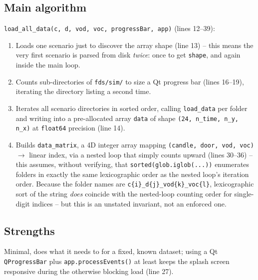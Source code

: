 \documentclass[11pt,a4paper]{report}
\begin{document}
\subsection{Main algorithm}
\texttt{load\_all\_data(c, d, vod, voc, progressBar, app)} (lines 12--39):
\begin{enumerate}[nosep]
\item Loads one scenario just to discover the array shape (line 13) -- this means the very first
scenario is parsed from disk \emph{twice}: once to get \texttt{shape}, and again inside the main loop.
\item Counts sub-directories of \texttt{fds/sim/} to size a Qt progress bar (lines 16--19), iterating
the directory listing a second time.
\item Iterates all scenario directories in sorted order, calling \texttt{load\_data} per folder and
writing into a pre-allocated array \texttt{data} of shape
\texttt{(24, n\_time, n\_y, n\_x)} at \texttt{float64} precision (line 14).
\item Builds \texttt{data\_matrix}, a 4D integer array mapping \texttt{(candle, door, vod, voc)}
$\to$ linear index, via a nested loop that simply counts upward (lines 30--36) -- this assumes,
without verifying, that \texttt{sorted(glob.iglob(...))} enumerates folders in exactly the same
lexicographic order as the nested loop's iteration order. Because the folder names are
\texttt{c\{i\}\_d\{j\}\_vod\{k\}\_voc\{l\}}, lexicographic sort of the string \emph{does} coincide with
the nested-loop counting order for single-digit indices -- but this is an unstated invariant, not an
enforced one.
\end{enumerate}

\subsection{Strengths}
Minimal, does what it needs to for a fixed, known dataset; using a Qt \texttt{QProgressBar} plus
\texttt{app.processEvents()} at least keeps the splash screen responsive during the otherwise blocking
load (line 27).
\end{document}
